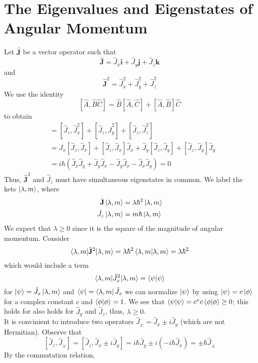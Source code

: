 \documentclass{report}
\begin{document}
\section{The Eigenvalues and Eigenstates of Angular Momentum}
Let \(\hat{\mathbf{J}}\) be a vector operator such that 
\[
\hat{\mathbf J} = \hat J_x  \mathbf i + \hat J_y  \mathbf j + \hat J_z  \mathbf k
\] 
and 
\[
\hat{\mathbf J}^2 = \hat{J}^2_x + \hat{J}^2_y + \hat{J}^2_z
\] 
We use the identity
\[
[\hat A, \hat B \hat C] = \hat B [\hat A, \hat C] + [\hat A, \hat B] \hat C
\] 
to obtain 
\begin{align*}
	[\hat J_z , \hat J_x^2 + \hat J_x^2 + \hat J_x^2] &= [\hat J_z, \hat J_x^2] + [\hat J_z, \hat J_y^2] + [\hat J_z, \hat J_z^2]\\
							  &= \hat J_x [\hat J_z , \hat J_x] + [\hat J_z, \hat J_x] \hat J_x + \hat J_y [\hat J_z , \hat J_y] + [ \hat J_z , \hat J_y] \hat J_y \\
							  &= i \hbar (\hat J_x \hat J_y + \hat J_y \hat J_x - \hat J_y \hat J_x - \hat J_x \hat J_y) = 0
\end{align*}
Thus, \(\hat{\mathbf J}^2\) and \(\hat J_z\) must have simultaneous eigenstates in common. We label the kets \(\ket{\lambda, m}\), where
\begin{align*}
	\hat{\mathbf J} \ket{\lambda, m} &= \lambda \hbar ^2 \ket{\lambda, m}\\
	\hat J_z \ket{\lambda, m} &= m \hbar \ket{\lambda, m}
\end{align*}
We expect that \(\lambda \geq 0\) since it is the square of the magnitude of angular momentum. Consider
\[
\braket{\lambda, m | \hat{\mathbf J}^2 | \lambda, m} = \lambda \hbar ^2 \braket{\lambda, m | \lambda , m} =\lambda \hbar^2 
\] 
which would include a term
\[
\braket{\lambda, m | \hat{J}^2_x | \lambda, m} = \braket{\psi | \psi}
\] 
for \(\ket{\psi} = \hat J_x \ket{\lambda, m}\) and \(\bra{\psi} = \bra{\lambda, m} \hat J_x\) we can normalize \(\ket{\psi}\) by using \(\ket \psi = c \ket \phi \) for a complex constant \(c\) and \(\braket{\phi | \phi} = 1\). We see that \(\braket{\psi | \psi} = c^*c\braket{\phi | \phi} \geq 0\); this holds for also holds for \(\hat J_y\) and \(\hat J_z\), thus, \(\lambda \geq 0\).  \\
It is convinient to introduce two operators \(\hat J_\pm = \hat J_x \pm i \hat J_y\) (which are not Hermitian). Observe that 
\[
	[\hat J_z, \hat J_\pm] = [\hat J_z, \hat J_x \pm i \hat J_y] = i \hbar \hat J_y \pm i ( -i \hbar \hat J_x) = \pm \hbar \hat J_\pm
\] 
By the commutation relation, 
\end{document}

